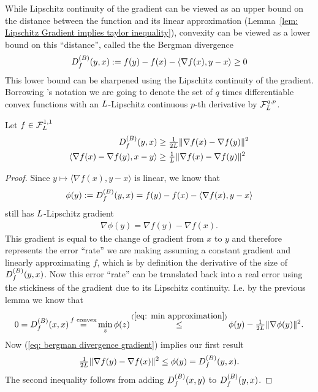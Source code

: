 While Lipschitz continuity of the gradient can be viewed as an upper
bound on the distance between the function and its linear approximation
(Lemma~\ref{lem: Lipschitz Gradient implies taylor inequality}),
convexity can be viewed as a lower bound on this ``distance'', called the 
the Bergman divergence
%
\begin{align*}
	\bergmanDiv{f}(y,x):= f(y)-f(x)-\langle \nabla f(x), y-x\rangle \ge 0
\end{align*}
%
This lower bound can be sharpened using the Lipschitz continuity of
the gradient.
Borrowing \citeauthor{nesterovLecturesConvexOptimization2018}'s notation
we are going to denote  the set of \(q\) times differentiable convex functions
with an \(\ubound\)-Lipschitz continuous \(p\)-th derivative by
\(\lipGradientSet[q,p]{\ubound}\).
%
\begin{lemma}\label{lem: bermanDiv lower bound}
	Let \(f\in\lipGradientSet{\ubound}\)
	\begin{subequations}
	\begin{align}
		\bergmanDiv{f}(y,x)
		&\ge \tfrac{1}{2\ubound}\|\nabla f(x) - \nabla f(y)\|^2\\
		\label{eq: bergmanDiv lower bound b}
		\langle \nabla f(x) - \nabla f(y), x-y\rangle
		&\ge \tfrac{1}{\ubound}\|\nabla f(x) - \nabla f(y)\|^2
	\end{align}	
	\end{subequations}	
\end{lemma}
\begin{proof}
	Since \(y\mapsto \langle\nabla f(x), y-x\rangle\) is linear, we know that
	\begin{align*}
		\phi(y):=\bergmanDiv{f}(y,x) = f(y)-f(x)-\langle \nabla f(x), y-x\rangle 
	\end{align*}
	still has \(\ubound\)-Lipschitz gradient
	\begin{align}\label{eq: bergman divergence gradient}
		\nabla\phi(y) = \nabla f(y) - \nabla f(x).
	\end{align}
	This gradient is equal to the change of gradient from \(x\) to \(y\) and 
	therefore represents the error ``rate'' we are making assuming a constant gradient
	and linearly approximating \(f\), which is by definition the derivative of the size of
	\(\bergmanDiv{f}(y,x)\). Now this error ``rate'' can be translated
 	back into a real error using the stickiness of the gradient due to
	its Lipschitz continuity. I.e. by the previous lemma we know that
	\begin{align*}
		0 = \bergmanDiv{f}(x,x)
		\xeq{f\text{ convex}} \min_z\phi(z)
		\xle{(\ref{eq: min approximation})} \phi(y) - \tfrac{1}{2\ubound}\|\nabla \phi(y)\|^2.
	\end{align*}
	Now (\ref{eq: bergman divergence gradient}) implies our first result
	\begin{align*}
		\tfrac{1}{2\ubound}\|\nabla f(y) - \nabla f(x)\|^2
		\le \phi(y) =\bergmanDiv{f}(y,x).
	\end{align*}
	The second inequality follows from adding \(\bergmanDiv{f}(x,y)\) to
	\(\bergmanDiv{f}(y,x)\).
\end{proof}

